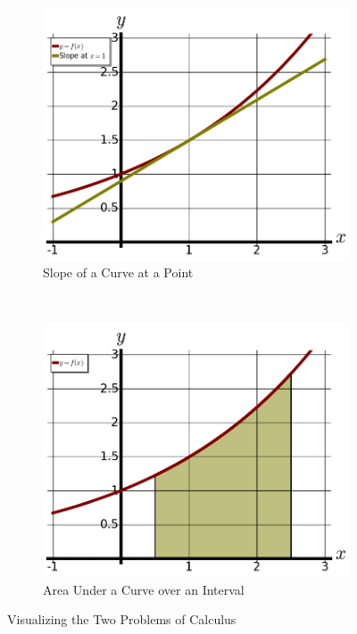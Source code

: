 \begin{figure}[h!]
    \centering
    \begin{subfigure}[b]{0.45\textwidth}
        \includegraphics[width=\textwidth]{img/chap0/ex0-1.png}
        \caption{Slope of a Curve at a Point}
        \label{fig:0slope}
    \end{subfigure}
    ~ %
    \begin{subfigure}[b]{0.45\textwidth}
        \includegraphics[width=\textwidth]{img/chap0/ex0-2.png}
        \caption{Area Under a Curve over an Interval}
        \label{fig:0area}
    \end{subfigure}
    \caption{Visualizing the Two Problems of Calculus}\label{fig:0-1}
\end{figure}

